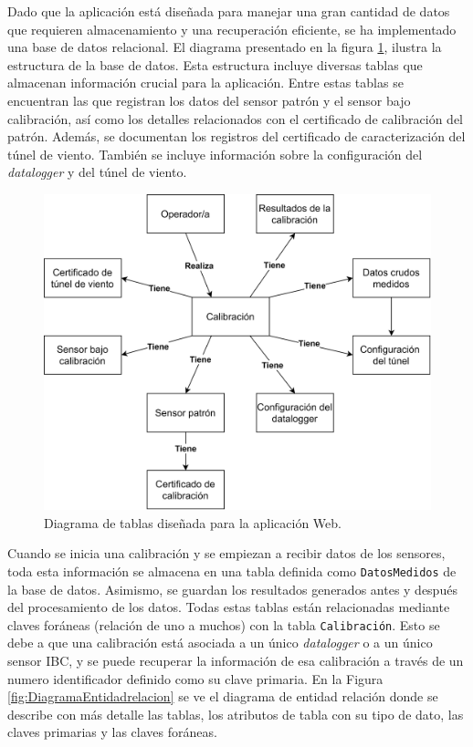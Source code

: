 Dado que la aplicación está diseñada para manejar una gran cantidad de datos que requieren almacenamiento y una recuperación eficiente, se ha implementado una base de datos relacional. El diagrama presentado en la figura \ref{fig:DiagramaSimplificadoBd}, ilustra la estructura de la base de datos. Esta estructura incluye diversas tablas que almacenan información crucial para la aplicación. Entre estas tablas se encuentran las que registran los datos del sensor patrón y el sensor bajo calibración, así como los detalles relacionados con el certificado de calibración del patrón. Además, se documentan los registros del certificado de caracterización del túnel de viento. También se incluye información sobre la configuración del \textit{datalogger} y del túnel de viento.
\begin{figure}[H]
    \centering
    \includegraphics[width=0.8\linewidth]{Figuras/AplicacionWeb/backend/DiagramaSimplificadoBd.png}
    \caption{Diagrama de tablas diseñada para la aplicación Web.}
    \label{fig:DiagramaSimplificadoBd}
\end{figure}

Cuando se inicia una calibración y se empiezan a recibir datos de los sensores, toda esta información se almacena en una tabla definida como \texttt{DatosMedidos} de la base de datos. Asimismo, se guardan los resultados generados antes y después del procesamiento de los datos. Todas estas tablas están relacionadas mediante claves foráneas (relación de uno a muchos) con la tabla \texttt{Calibración}. Esto se debe a que una calibración está asociada a un único \textit{datalogger} o a un único sensor IBC, y se puede recuperar la información de esa  calibración a través de un numero identificador definido como su clave primaria. En la Figura \ref{fig:DiagramaEntidadrelacion} se ve el diagrama de entidad relación donde se describe con más detalle las tablas, los atributos de tabla con su tipo de dato, las claves primarias y las claves foráneas.


